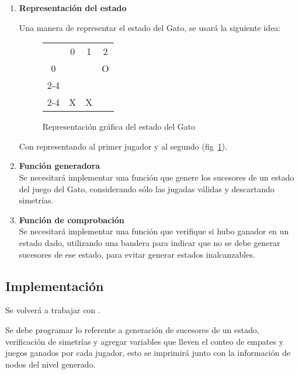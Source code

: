 \begin{enumerate}
  \item \textbf{Representación del estado} \hfill\par
    Una manera de representar el estado del Gato, se usará la siguiente idea:\medskip
    

    \begin{figure}[h!]
      \begin{center}
        \begin{tabular}{c l | l | l }
           & \multicolumn{1}{c}{\tiny{0}} & \multicolumn{1}{c}{\tiny{1}} & \multicolumn{1}{c}{\tiny{2}} \\
           \multicolumn{1}{c}{\tiny{0}} &   &   & O \\ \cline{2-4}
           \multicolumn{1}{c}{\tiny{1}} &   &   &   \\ \cline{2-4}
           \multicolumn{1}{c}{\tiny{2}} & X & X &
        \end{tabular}
      \end{center}
      \caption{Representación gráfica del estado del Gato}
      \label{fig:representacionestado}
    \end{figure}

    Con  representando al primer jugador y  al segundo (fig~\ref{fig:representacionestado}).


  \item \textbf{Función generadora}\hfill \\
    Se necesitará implementar una función que genere los sucesores de un estado del juego del Gato, considerando sólo las jugadas válidas y descartando simetrías.

  \item \textbf{Función de comprobación} \hfill \\
    Se necesitará implementar una función que verifique si hubo ganador en un estado dado, utilizando una bandera para indicar que no se debe generar sucesores de ese estado, para evitar generar estados inalcanzables.
\end{enumerate}


\subsection{Implementaci\'on}
Se volverá a trabajar con .

Se debe programar lo referente a generación de sucesores de un estado, verificación de simetrías y agregar variables que lleven el conteo de empates y juegos ganados por cada jugador, esto se imprimirá junto con la información de nodos del nivel generado.

